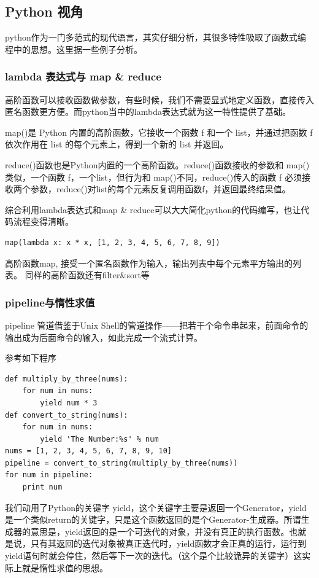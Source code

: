 \documentclass{article}
\begin{document}
	\subsection{Python 视角}
	python作为一门多范式的现代语言，其实仔细分析，其很多特性吸取了函数式编程中的思想。这里据一些例子分析。
		\subsubsection{lambda 表达式与 map \& reduce}
		高阶函数可以接收函数做参数，有些时候，我们不需要显式地定义函数，直接传入匿名函数更方便。而python当中的lambda表达式就为这一特性提供了基础。
		
		map()是 Python 内置的高阶函数，它接收一个函数 f 和一个 list，并通过把函数 f 依次作用在 list 的每个元素上，得到一个新的 list 并返回。
		
		reduce()函数也是Python内置的一个高阶函数。reduce()函数接收的参数和 map()类似，一个函数 f，一个list，但行为和 map()不同，reduce()传入的函数 f 必须接收两个参数，reduce()对list的每个元素反复调用函数f，并返回最终结果值。
		
		综合利用lambda表达式和map \& reduce可以大大简化python的代码编写，也让代码流程变得清晰。
		
		\lstset{language=python}
		\begin{lstlisting}
map(lambda x: x * x, [1, 2, 3, 4, 5, 6, 7, 8, 9])
		\end{lstlisting}
		
		高阶函数map, 接受一个匿名函数作为输入，输出列表中每个元素平方输出的列表。
		同样的高阶函数还有filter\&sort等
		
		\subsubsection{pipeline与惰性求值}
		pipeline 管道借鉴于Unix Shell的管道操作——把若干个命令串起来，前面命令的输出成为后面命令的输入，如此完成一个流式计算。
		
		参考如下程序
		\lstset{language=python}
		\begin{lstlisting}
def multiply_by_three(nums):
	for num in nums:
		yield num * 3
def convert_to_string(nums):
	for num in nums:
		yield 'The Number:%s' % num
nums = [1, 2, 3, 4, 5, 6, 7, 8, 9, 10]
pipeline = convert_to_string(multiply_by_three(nums))
for num in pipeline:
	print num
		\end{lstlisting}
		
		我们动用了Python的关键字 yield，这个关键字主要是返回一个Generator，yield 是一个类似return的关键字，只是这个函数返回的是个Generator-生成器。所谓生成器的意思是，yield返回的是一个可迭代的对象，并没有真正的执行函数。也就是说，只有其返回的迭代对象被真正迭代时，yield函数才会正真的运行，运行到yield语句时就会停住，然后等下一次的迭代。（这个是个比较诡异的关键字）这实际上就是惰性求值的思想。
\end{document}
